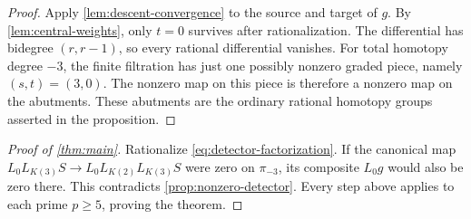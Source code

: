 \begin{proof}
Apply \cref{lem:descent-convergence} to the source and target of $g$.
By \cref{lem:central-weights}, only $t=0$ survives after rationalization.
The differential has bidegree $(r,r-1)$, so every rational differential
vanishes.  For total homotopy degree $-3$, the finite filtration has
just one possibly nonzero graded piece, namely $(s,t)=(3,0)$.
The nonzero map on this piece is therefore a nonzero map on the
abutments.  These abutments are the ordinary rational homotopy groups
asserted in the proposition.
\end{proof}

\begin{proof}[Proof of \cref{thm:main}]
Rationalize \eqref{eq:detector-factorization}.  If the canonical map
$L_0L_{K(3)}S\to L_0L_{K(2)}L_{K(3)}S$ were zero on $\pi_{-3}$,
its composite $L_0g$ would also be zero there.  This contradicts
\cref{prop:nonzero-detector}.  Every step above applies to each prime
$p\geq5$, proving the theorem.
\end{proof}
